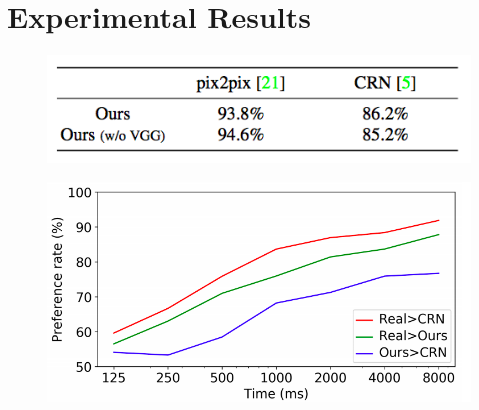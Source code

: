 \documentclass{beamer}
\begin{document}
\section{Experimental Results}

\begin{frame}
\begin{figure}
	\centering
	\includegraphics[height=0.35\textheight]{images/unlimite_time}
\end{figure}
\end{frame}

\begin{frame}
\begin{figure}
	\centering
	\includegraphics[height=0.45\textheight]{images/limite_time}
\end{figure}
\end{frame}
\end{document}
